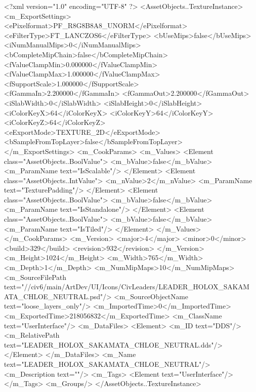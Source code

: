 <?xml version="1.0" encoding="UTF-8" ?>
<AssetObjects..TextureInstance>
	<m_ExportSettings>
		<ePixelformat>PF_R8G8B8A8_UNORM</ePixelformat>
		<eFilterType>FT_LANCZOS6</eFilterType>
		<bUseMips>false</bUseMips>
		<iNumManualMips>0</iNumManualMips>
		<bCompleteMipChain>false</bCompleteMipChain>
		<fValueClampMin>0.000000</fValueClampMin>
		<fValueClampMax>1.000000</fValueClampMax>
		<fSupportScale>1.000000</fSupportScale>
		<fGammaIn>2.200000</fGammaIn>
		<fGammaOut>2.200000</fGammaOut>
		<iSlabWidth>0</iSlabWidth>
		<iSlabHeight>0</iSlabHeight>
		<iColorKeyX>64</iColorKeyX>
		<iColorKeyY>64</iColorKeyY>
		<iColorKeyZ>64</iColorKeyZ>
		<eExportMode>TEXTURE_2D</eExportMode>
		<bSampleFromTopLayer>false</bSampleFromTopLayer>
	</m_ExportSettings>
	<m_CookParams>
		<m_Values>
			<Element class="AssetObjects..BoolValue">
				<m_bValue>false</m_bValue>
				<m_ParamName text="IsScalable"/>
			</Element>
			<Element class="AssetObjects..IntValue">
				<m_nValue>2</m_nValue>
				<m_ParamName text="TexturePadding"/>
			</Element>
			<Element class="AssetObjects..BoolValue">
				<m_bValue>false</m_bValue>
				<m_ParamName text="IsStandalone"/>
			</Element>
			<Element class="AssetObjects..BoolValue">
				<m_bValue>false</m_bValue>
				<m_ParamName text="IsTiled"/>
			</Element>
		</m_Values>
	</m_CookParams>
	<m_Version>
		<major>4</major>
		<minor>0</minor>
		<build>329</build>
		<revision>932</revision>
	</m_Version>
	<m_Height>1024</m_Height>
	<m_Width>765</m_Width>
	<m_Depth>1</m_Depth>
	<m_NumMipMaps>10</m_NumMipMaps>
	<m_SourceFilePath text="//civ6/main/ArtDev/UI/Icons/CivLeaders/LEADER_HOLOX_SAKAMATA_CHLOE_NEUTRAL.psd"/>
	<m_SourceObjectName text="loose_layers_only"/>
	<m_ImportedTime>0</m_ImportedTime>
	<m_ExportedTime>218056832</m_ExportedTime>
	<m_ClassName text="UserInterface"/>
	<m_DataFiles>
		<Element>
			<m_ID text="DDS"/>
			<m_RelativePath text="LEADER_HOLOX_SAKAMATA_CHLOE_NEUTRAL.dds"/>
		</Element>
	</m_DataFiles>
	<m_Name text="LEADER_HOLOX_SAKAMATA_CHLOE_NEUTRAL"/>
	<m_Description text=""/>
	<m_Tags>
		<Element text="UserInterface"/>
	</m_Tags>
	<m_Groups/>
</AssetObjects..TextureInstance>

